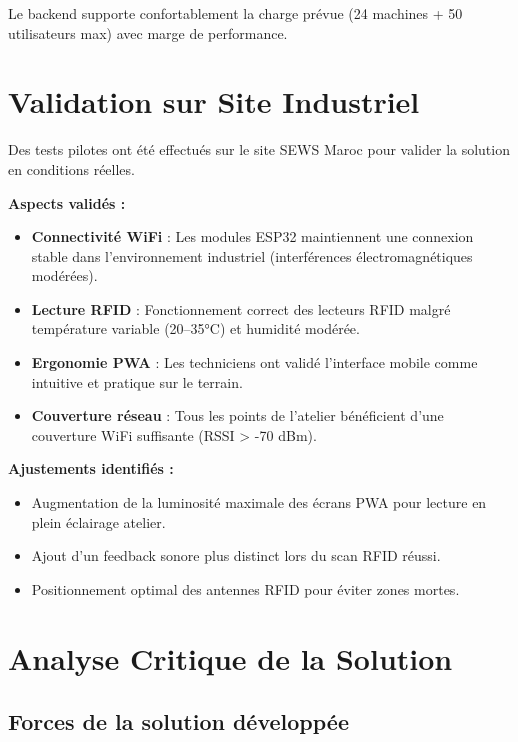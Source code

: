 Le backend supporte confortablement la charge prévue (24 machines + 50 utilisateurs max) avec marge de performance.

\section{Validation sur Site Industriel}

Des tests pilotes ont été effectués sur le site SEWS Maroc pour valider la solution en conditions réelles.

\textbf{Aspects validés :}
\begin{itemize}
    \item \textbf{Connectivité WiFi} : Les modules ESP32 maintiennent une connexion stable dans l'environnement industriel (interférences électromagnétiques modérées).
    \item \textbf{Lecture RFID} : Fonctionnement correct des lecteurs RFID malgré température variable (20--35°C) et humidité modérée.
    \item \textbf{Ergonomie PWA} : Les techniciens ont validé l'interface mobile comme intuitive et pratique sur le terrain.
    \item \textbf{Couverture réseau} : Tous les points de l'atelier bénéficient d'une couverture WiFi suffisante (RSSI > -70 dBm).
\end{itemize}

\textbf{Ajustements identifiés :}
\begin{itemize}
    \item Augmentation de la luminosité maximale des écrans PWA pour lecture en plein éclairage atelier.
    \item Ajout d'un feedback sonore plus distinct lors du scan RFID réussi.
    \item Positionnement optimal des antennes RFID pour éviter zones mortes.
\end{itemize}

\section{Analyse Critique de la Solution}

\subsection{Forces de la solution développée}

